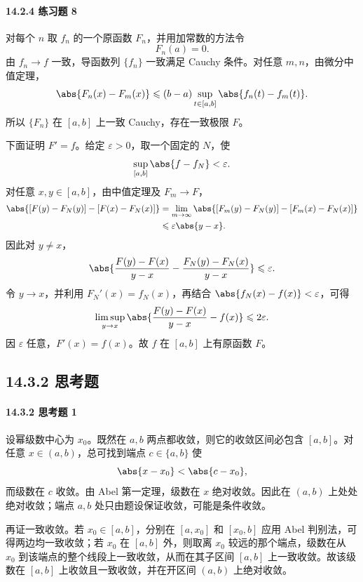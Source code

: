 \paragraph{14.2.4 练习题 8}
\begin{xsolution}
对每个 $n$ 取 $f_n$ 的一个原函数 $F_n$，并用加常数的方法令
\[
  F_n(a)=0.
\]
由 $f_n\to f$ 一致，导函数列 $\{f_n\}$ 一致满足 Cauchy 条件。对任意 $m,n$，由微分中值定理，
\[
  \abs{F_n(x)-F_m(x)}
  \leqslant(b-a)\sup_{t\in[a,b]}\abs{f_n(t)-f_m(t)}.
\]
所以 $\{F_n\}$ 在 $[a,b]$ 上一致 Cauchy，存在一致极限 $F$。

下面证明 $F'=f$。给定 $\varepsilon>0$，取一个固定的 $N$，使
\[
  \sup_{[a,b]}\abs{f-f_N}<\varepsilon.
\]
对任意 $x,y\in[a,b]$，由中值定理及 $F_m\to F$，
\[
\begin{aligned}
  \abs{[F(y)-F_N(y)]-[F(x)-F_N(x)]}
  &=\lim_{m\to\infty}\abs{[F_m(y)-F_N(y)]-[F_m(x)-F_N(x)]}\\
  &\leqslant\varepsilon\abs{y-x}.
\end{aligned}
\]
因此对 $y\ne x$，
\[
  \abs{\frac{F(y)-F(x)}{y-x}-\frac{F_N(y)-F_N(x)}{y-x}}
  \leqslant\varepsilon.
\]
令 $y\to x$，并利用 $F_N'(x)=f_N(x)$，再结合 $\abs{f_N(x)-f(x)}<\varepsilon$，可得
\[
  \limsup_{y\to x}\abs{\frac{F(y)-F(x)}{y-x}-f(x)}\leqslant2\varepsilon.
\]
因 $\varepsilon$ 任意，$F'(x)=f(x)$。故 $f$ 在 $[a,b]$ 上有原函数 $F$。
\end{xsolution}

\subsection*{14.3.2 思考题}

\paragraph{14.3.2 思考题 1}
\begin{xsolution}
设幂级数中心为 $x_0$。既然在 $a,b$ 两点都收敛，则它的收敛区间必包含 $[a,b]$。对任意 $x\in(a,b)$，总可找到端点 $c\in\{a,b\}$ 使
\[
  \abs{x-x_0}<\abs{c-x_0},
\]
而级数在 $c$ 收敛。由 Abel 第一定理，级数在 $x$ 绝对收敛。因此在 $(a,b)$ 上处处绝对收敛；端点 $a,b$ 处只由题设保证收敛，可能是条件收敛。

再证一致收敛。若 $x_0\in[a,b]$，分别在 $[a,x_0]$ 和 $[x_0,b]$ 应用 Abel 判别法，可得两边均一致收敛；若 $x_0$ 在 $[a,b]$ 外，则取离 $x_0$ 较远的那个端点，级数在从 $x_0$ 到该端点的整个线段上一致收敛，从而在其子区间 $[a,b]$ 上一致收敛。故该级数在 $[a,b]$ 上收敛且一致收敛，并在开区间 $(a,b)$ 上绝对收敛。
\end{xsolution}

